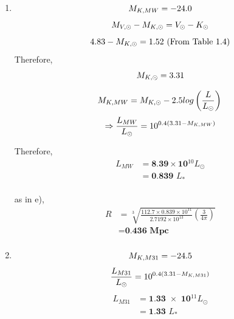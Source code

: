 \documentclass[10pt,letterpaper]{article}
\begin{document}
\begin{enumerate}
\begin{enumerate}
\item 
\begin{equation}\nonumber
M_{K,MW} = -24.0\\
\end{equation}
\begin{equation}\nonumber
M_{V, \odot} - M_{K, \odot} = V_\odot - K_\odot\\
\end{equation}
\begin{equation}\nonumber
4.83 - M_{K, \odot} = 1.52 \text{ (From Table 1.4)}\\
\end{equation}
Therefore, 
\begin{equation}\nonumber
M_{K, \odot} = 3.31\\
\end{equation}

\begin{equation}\nonumber
M_{K, MW} = M_{K, \odot} - 2.5 log \left(\frac{L}{L_\odot}\right)\\
\end{equation}
\begin{equation}\nonumber
\Rightarrow \frac{L_{MW}}{L_\odot} = 10^{0.4(3.31 - M_{K, MW})}\\
\end{equation}

Therefore, 
\begin{equation}\nonumber
\begin{split}
L_{MW} & = \textbf{8.39$\times$10$^{10} L_\odot$}\\
 & = \textbf{0.839 $L_*$}\\
\end{split}
\end{equation}

as in e), \begin{equation}\nonumber
\begin{split}
R & = \sqrt[3]{\frac{112.7\times0.839\times10^{11}}{2.7192 \times10^{13}}\left(\frac{3}{4\pi}\right)}\\
 & = \textbf{0.436 Mpc}\\
\end{split}
\end{equation}

\item
\begin{equation}\nonumber
M_{K, M31} = -24.5\\
\end{equation}
\begin{equation}\nonumber
\frac{L_{M31}}{L_\odot} = 10^{0.4(3.31 - M_{K, M31})}\\
\end{equation}
\begin{equation}\nonumber
\begin{split}
L_{M31} & = \textbf{1.33 $\times$ 10$^{11} L_\odot$}\\
 & = \textbf{1.33 $L_*$}\\
\end{split}
\end{equation}


\end{enumerate}
\end{enumerate}
\end{document}
